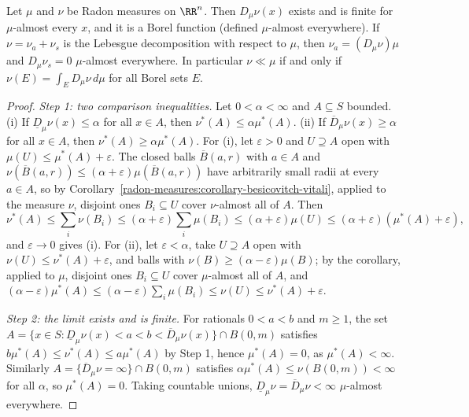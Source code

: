 \begin{theorem}\label{radon-measures:theorem-besicovitch-differentiation}
Let $\mu$ and $\nu$ be Radon measures on $\RR^n$. Then $D_\mu\nu(x)$ exists and is finite for $\mu$-almost every $x$, and it is a Borel function (defined $\mu$-almost everywhere). If
$\nu = \nu_a + \nu_s$ is the Lebesgue decomposition with respect to $\mu$, then $\nu_a = (D_\mu\nu)\mu$ and $D_\mu\nu_s = 0$ $\mu$-almost everywhere. In particular $\nu \ll \mu$ if and only if
$\nu(E) = \int_ED_\mu\nu\,d\mu$ for all Borel sets $E$.
\end{theorem}

\begin{proof}
\emph{Step 1: two comparison inequalities.} Let $0 < \alpha < \infty$ and $A \subseteq S$ bounded. (i) If $\underline{D}_\mu\nu(x) \leq \alpha$ for all $x \in A$, then $\nu^*(A) \leq \alpha\mu^*(A)$. (ii) If
$\overline{D}_\mu\nu(x) \geq \alpha$ for all $x \in A$, then $\nu^*(A) \geq \alpha\mu^*(A)$. For (i), let $\varepsilon > 0$ and $U \supseteq A$ open with $\mu(U) \leq \mu^*(A) + \varepsilon$. The closed balls
$\overline{B}(a, r)$ with $a \in A$ and $\nu(\overline{B}(a, r)) \leq (\alpha + \varepsilon)\mu(\overline{B}(a, r))$ have arbitrarily small radii at every $a \in A$, so by
Corollary~\ref{radon-measures:corollary-besicovitch-vitali}, applied to the measure $\nu$, disjoint ones $B_i \subseteq U$ cover $\nu$-almost all of $A$. Then
\[
\nu^*(A) \leq \sum_i\nu(B_i) \leq (\alpha + \varepsilon)\sum_i\mu(B_i) \leq (\alpha + \varepsilon)\mu(U) \leq (\alpha + \varepsilon)(\mu^*(A) + \varepsilon),
\]
and $\varepsilon \to 0$ gives (i). For (ii), let $\varepsilon < \alpha$, take $U \supseteq A$ open with $\nu(U) \leq \nu^*(A) + \varepsilon$, and balls with $\nu(B) \geq (\alpha - \varepsilon)\mu(B)$; by the
corollary, applied to $\mu$, disjoint ones $B_i \subseteq U$ cover $\mu$-almost all of $A$, and $(\alpha - \varepsilon)\mu^*(A) \leq (\alpha - \varepsilon)\sum_i\mu(B_i) \leq \nu(U) \leq \nu^*(A) + \varepsilon$.

\emph{Step 2: the limit exists and is finite.} For rationals $0 < a < b$ and $m \geq 1$, the set $A = \{x \in S : \underline{D}_\mu\nu(x) < a < b < \overline{D}_\mu\nu(x)\} \cap B(0, m)$ satisfies
$b\mu^*(A) \leq \nu^*(A) \leq a\mu^*(A)$ by Step 1, hence $\mu^*(A) = 0$, as $\mu^*(A) < \infty$. Similarly $A = \{\overline{D}_\mu\nu = \infty\} \cap B(0, m)$ satisfies
$\alpha\mu^*(A) \leq \nu(B(0, m)) < \infty$ for all $\alpha$, so $\mu^*(A) = 0$. Taking countable unions, $\underline{D}_\mu\nu = \overline{D}_\mu\nu < \infty$ $\mu$-almost everywhere.


\end{proof}
